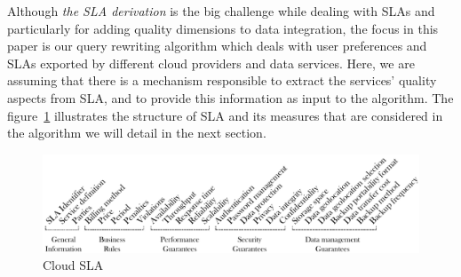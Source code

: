 Although \textit{the SLA derivation} is the big challenge while dealing with
SLAs and particularly for adding quality dimensions to data integration, the
focus in this paper is our query rewriting algorithm which deals with user
preferences and SLAs exported by different cloud providers and data services.
Here, we are assuming that there is a mechanism responsible to extract the
services' quality aspects from SLA, and to provide this information as input to
the algorithm. The figure~\ref{fig:cloudsla} illustrates the structure of SLA
and its measures that are considered in the algorithm we will detail in the next
section.   

\begin{figure}[h!]
\center
\includegraphics[scale=0.57]{Cloud_SLA.pdf}
\caption{Cloud SLA}\label{fig:cloudsla}
\end{figure}
